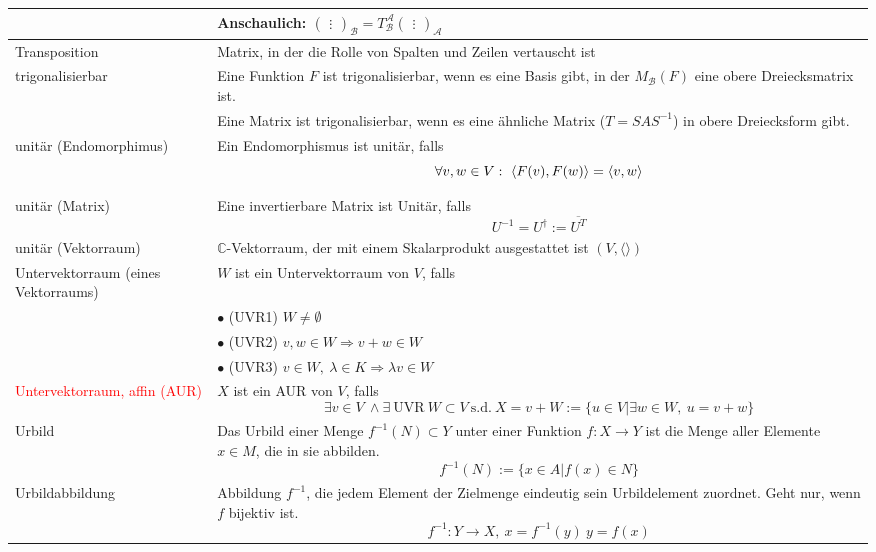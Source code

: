 \documentclass{article}
\begin{document}
\begin{xltabular}{\linewidth}{p{0.33\textwidth}|X}
		& {\color{gruen} Anschaulich: 
			$\begin{pmatrix}
				\vdots
			\end{pmatrix}_{\mathcal{B}} 
			= T_{\mathcal{B}}^{\mathcal{A}}
			\begin{pmatrix}
				\vdots
			\end{pmatrix}_{\mathcal{A}}$}\\
	\hline
		Transposition & Matrix, in der die Rolle von Spalten und Zeilen vertauscht ist \\
	\hline
		trigonalisierbar & Eine Funktion $F$ ist trigonalisierbar, wenn es eine Basis gibt, in der $M_\mathcal{B}(F)$ eine obere Dreiecksmatrix ist.\\
		& Eine Matrix ist trigonalisierbar, wenn es eine ähnliche Matrix ($T = SAS^{-1}$) in obere Dreiecksform gibt.\\
	\hline
		unitär (Endomorphimus) & Ein Endomorphismus ist unitär, falls 
			$$\forall v,w\in V:\ \braket{F(v),F(w)} = \braket{v,w}$$ \\
	\hline
		unitär (Matrix) & Eine invertierbare Matrix ist Unitär, falls
			$$U^{-1} = U^\dagger := \overline{U^T}$$ \\
	\hline
		unitär (Vektorraum) & $\mathbb{C}$-Vektorraum, der mit einem Skalarprodukt  ausgestattet ist $(V,\langle\rangle)$ \\
	\hline
		Untervektorraum (eines Vektorraums) & $W$ ist ein Untervektorraum von $V$, falls \\
		& $\bullet$ \textcolor{gruen}{(UVR1)} $W\neq \emptyset$ \\
		& $\bullet$ \textcolor{gruen}{(UVR2)} $v,w\in W \Rightarrow v+w\in W$ \\
		& $\bullet$ \textcolor{gruen}{(UVR3)} $v\in W,\ \lambda\in K \Rightarrow \lambda v\in W$ \\
	\hline
		\textcolor{red}{Untervektorraum, affin (AUR)} & $X$ ist ein AUR von $V$, falls
			$$\exists v\in V\ \wedge \exists\ \text{UVR}\ W \subset V\ \text{s.d.}\ X = v + W := \{u\in V | \exists w\in W,\ u=v+w\}$$  \\
	\hline
		Urbild & Das Urbild einer Menge $f^{-1}(N)\subset Y$ unter einer Funktion $f:X\rightarrow Y$ ist die Menge aller Elemente $x\in M$, die in sie abbilden.
			$$f^{-1}(N) := \{x\in A | f(x)\in N\}$$ \\
	\hline
		Urbildabbildung & Abbildung $f^{-1}$, die jedem Element der Zielmenge eindeutig sein Urbildelement zuordnet. \textcolor{gruen}{Geht nur, wenn $f$ bijektiv ist.}
			$$f^{-1}:Y\rightarrow X,\ x = f^{-1}(y)\ y=f(x)$$ \\

\end{xltabular}
\end{document}
